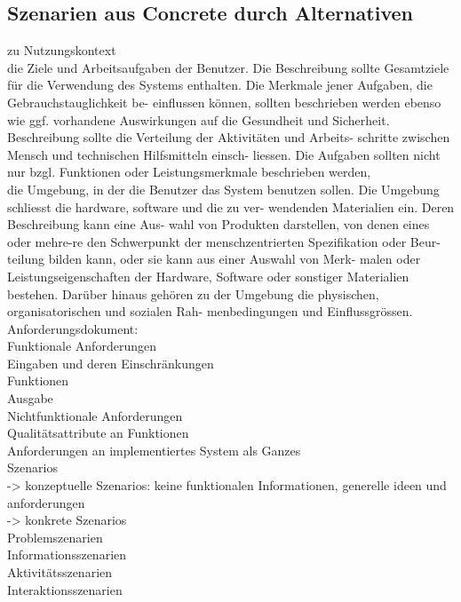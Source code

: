 \subsection{Szenarien aus Concrete durch Alternativen}

zu Nutzungskontext\\
die Ziele und Arbeitsaufgaben der Benutzer. Die Beschreibung sollte Gesamtziele für die Verwendung des Systems enthalten. Die Merkmale jener Aufgaben, die Gebrauchstauglichkeit be- einflussen können, sollten beschrieben werden ebenso wie ggf. vorhandene Auswirkungen auf die Gesundheit und Sicherheit. Beschreibung sollte die Verteilung der Aktivitäten und Arbeits- schritte zwischen Mensch und technischen Hilfsmitteln einsch- liessen. Die Aufgaben sollten nicht nur bzgl. Funktionen oder Leistungsmerkmale beschrieben werden,\\

die Umgebung, in der die Benutzer das System benutzen sollen. Die Umgebung schliesst die hardware, software und die zu ver- wendenden Materialien ein. Deren Beschreibung kann eine Aus- wahl von Produkten darstellen, von denen eines oder mehre-re den Schwerpunkt der menschzentrierten Spezifikation oder Beur- teilung bilden kann, oder sie kann aus einer Auswahl von Merk- malen oder Leistungseigenschaften der Hardware, Software oder sonstiger Materialien bestehen. Darüber hinaus gehören zu der Umgebung die physischen, organisatorischen und sozialen Rah- menbedingungen und Einflussgrössen.\\


Anforderungsdokument:\\
Funktionale Anforderungen\\
Eingaben und deren Einschränkungen\\
Funktionen\\
Ausgabe\\

Nichtfunktionale Anforderungen\\
Qualitätsattribute an Funktionen\\
Anforderungen an implementiertes System als Ganzes\\


Szenarios\\
-> konzeptuelle Szenarios: keine funktionalen Informationen, generelle ideen und anforderungen\\
-> konkrete Szenarios\\
Problemszenarien\\
Informationsszenarien\\
Aktivitätsszenarien\\
Interaktionsszenarien






